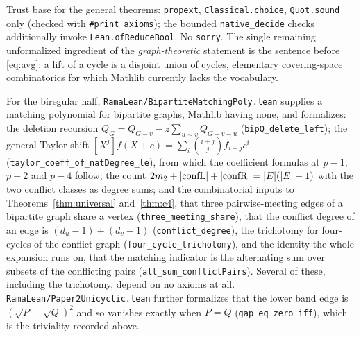 \documentclass[11pt]{article}
\theoremstyle{remark}
\begin{document}
Trust base for the general theorems: \texttt{propext}, \texttt{Classical.choice},
\texttt{Quot.sound} only (checked with \texttt{\#print axioms}); the bounded
\texttt{native\_decide} checks additionally invoke \texttt{Lean.ofReduceBool}.
No \texttt{sorry}. The single remaining unformalized ingredient of the
\emph{graph-theoretic} statement is the sentence before \eqref{eq:avg}: a lift
of a cycle is a disjoint union of cycles, elementary covering-space
combinatorics for which Mathlib currently lacks the vocabulary.

For the biregular half, \texttt{RamaLean/BipartiteMatchingPoly.lean} supplies a
matching polynomial for bipartite graphs, Mathlib having none, and formalizes:
the deletion recursion $Q_G=Q_{G-v}-z\sum_{u\sim v}Q_{G-v-u}$
(\texttt{bipQ\_delete\_left}); the general Taylor shift
$[X^j]f(X+c)=\sum_i\binom{i+j}{j}f_{i+j}c^i$
(\texttt{taylor\_coeff\_of\_natDegree\_le}), from which the coefficient formulas at
$p-1$, $p-2$ and $p-4$ follow; the count $2m_2+|{\rm confL}|+|{\rm confR}|=|E|(|E|-1)$
with the two conflict classes as degree sums; and the combinatorial inputs to
Theorems~\ref{thm:universal} and~\ref{thm:c4}, that three pairwise-meeting edges
of a bipartite graph share a vertex (\texttt{three\_meeting\_share}), that the
conflict degree of an edge is $(d_u-1)+(d_v-1)$ (\texttt{conflict\_degree}), the
trichotomy for four-cycles of the conflict graph
(\texttt{four\_cycle\_trichotomy}), and the identity the whole expansion runs on,
that the matching indicator is the alternating sum over subsets of the conflicting
pairs (\texttt{alt\_sum\_conflictPairs}). Several of these, including the
trichotomy, depend on no axioms at all. \texttt{RamaLean/Paper2Unicyclic.lean}
further formalizes that the lower band edge is $(\sqrt P-\sqrt Q)^2$ and so
vanishes exactly when $P=Q$ (\texttt{gap\_eq\_zero\_iff}), which is the triviality
recorded above.
\end{document}
